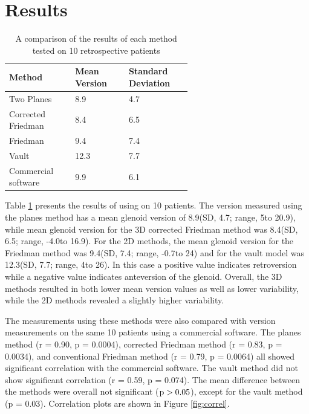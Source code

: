 \section{Results}
\label{sec:results}
\begin{table}
	\begin{center}
		\begin{tabular}{|p{0.2\linewidth}|p{0.2\linewidth}|p{0.2\linewidth}|} \hline
			Method & Mean Version & Standard Deviation \\ \hline
			Two Planes & 8.9\degree & 4.7\degree \\
			Corrected Friedman & 8.4\degree & 6.5\degree \\
			Friedman & 9.4\degree & 7.4\degree \\
			Vault & 12.3\degree & 7.7\degree \\
			Commercial software & 9.9\degree & 6.1\degree \\
                        \hline
		\end{tabular}
	\end{center}
	\caption{\label{tab:results}A comparison of the results of each method tested 
	on 10 retrospective patients}
\end{table}

Table \ref{tab:results} presents the results of using \sksglenoid on 10 patients.
The version measured using the planes method has a mean glenoid
version of 8.9\degree (SD, 4.7\degree; range, 5\degree to 20.9\degree), 
while mean glenoid version 
for the 3D corrected Friedman method 
was 8.4\degree (SD, 6.5\degree; range, -4.0\degree to 16.9\degree). 
For the 2D methods, the mean glenoid version for the 
Friedman method was 9.4\degree (SD, 7.4\degree; range, -0.7\degree to 24\degree) 
and for the vault model was 12.3\degree (SD, 7.7\degree; range, 4\degree to 26\degree).
In this 
case a positive value indicates retroversion while a negative value indicates anteversion of the 
glenoid. Overall, the 3D methods resulted in both lower mean version values as well as lower
variability, while the 2D methods revealed a slightly higher variability.

The measurements using these methods were also compared with version measurements on the same
10 patients using a commercial software\cite{djosurgical}. 
The planes method (r = 0.90, p = 0.0004), 
corrected Friedman method (r = 0.83, p = 0.0034), 
and conventional Friedman method (r = 0.79, p = 0.0064) 
all showed significant correlation with the commercial software. 
The vault method did not show significant correlation (r = 0.59, p = 0.074).  
The mean difference between the methods were overall not significant ($\rm{p} > 0.05$), 
except for the vault method (p = 0.03). Correlation plots are shown in Figure \ref{fig:correl}.

